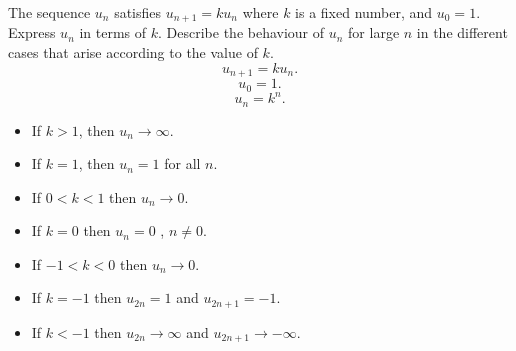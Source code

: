 The sequence $u_n$ satisfies $u_{n+1} = ku_n$ where $k$ is a fixed number, and $u_0 = 1$. Express $u_n$ in terms of $k$. Describe the behaviour of $u_n$ for large $n$ in the different cases that arise according to the value of $k$.
\newline
\[
u_{n+1} = ku_n.
\]
\[
u_0 = 1.
\]
\[
u_n = k^n.
\]
\begin{itemize}
\item
If $k > 1$, then $u_n \to \infty$.
\item
If $ k = 1$, then $u_n = 1$ for all $n$.
\item
If $0 < k < 1$ then $u_n \to 0$.
\item
If $k = 0$ then $u_n = 0$ , $n \neq 0$.
\item
If $-1 < k < 0$ then $u_n \to 0$.
\item
If $k = -1$ then $u_{2n} = 1$ and $u_{2n+1} = -1$. 
\item
If $k < -1$ then $u_{2n} \to \infty$ and $u_{2n+1} \to -\infty$.
\end{itemize}